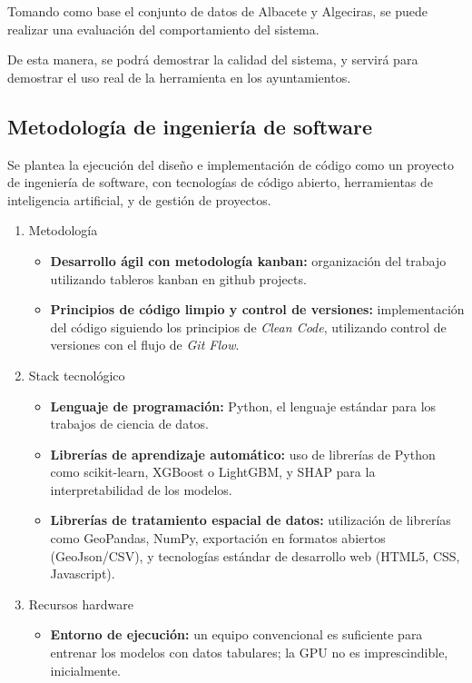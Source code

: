 Tomando como base el conjunto de datos de Albacete y Algeciras, se puede realizar una evaluación del comportamiento del sistema.

De esta manera, se podrá demostrar la calidad del sistema, y servirá para demostrar el uso real de la herramienta en los ayuntamientos.

\subsection{Metodología de ingeniería de software}
Se plantea la ejecución del diseño e implementación de código como un proyecto de ingeniería de software, con tecnologías de código abierto, herramientas de inteligencia artificial, y de gestión de proyectos.

\begin{enumerate}
    \item Metodología
        \begin{itemize}
            \item \textbf{Desarrollo ágil con metodología \gls{kanban}:} organización del trabajo utilizando tableros \gls{kanban} en \gls{github} projects.
            \item \textbf{Principios de código limpio y control de versiones:} implementación del código siguiendo los principios de \textit{Clean Code}, utilizando control de versiones con el flujo de \textit{Git Flow}.
        \end{itemize}
    \item Stack tecnológico
        \begin{itemize}
            \item \textbf{Lenguaje de programación:} Python, el lenguaje estándar para los trabajos de ciencia de datos.
            \item \textbf{Librerías de aprendizaje automático:} uso de librerías de Python como scikit-learn, XGBoost o LightGBM, y SHAP para la interpretabilidad de los modelos.
            \item \textbf{Librerías de tratamiento espacial de datos:} utilización de librerías como GeoPandas, NumPy, exportación en formatos abiertos (GeoJson/CSV), y tecnologías estándar de desarrollo web (HTML5, CSS, Javascript).
        \end{itemize}
    \item Recursos hardware
        \begin{itemize}
            \item \textbf{Entorno de ejecución:} un equipo convencional es suficiente para entrenar los modelos con datos tabulares; la \gls{GPU} no es imprescindible, inicialmente.

\end{itemize}
\end{enumerate}
